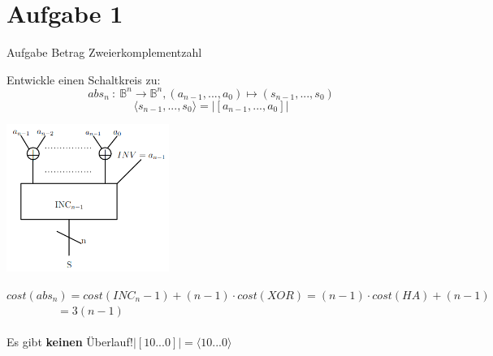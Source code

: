 
\section{Aufgabe 1}

\setcounter{exercise}{1}

\begin{frame}[allowframebreaks]{Aufgabe \thesection}{Betrag Zweierkomplementzahl}

\begin{exercisenoinc}
Entwickle einen Schaltkreis zu:\\
$$abs_n\ :\ \mathbb{B}^n\rightarrow\mathbb{B}^n, (a_{n-1},...,a_0)\mapsto (s_{n-1},...,s_0)$$
$$\langle s_{n-1},...,s_0\rangle = |[a_{n-1},...,a_0]|$$
\end{exercisenoinc}


\begin{solutionnoinc}
    \center \includegraphics[width=150pt]{figures/Absolute.png}
\end{solutionnoinc}

\begin{solutionnoinc}
    $cost(abs_n)=cost(INC_n-1)+(n-1)\cdot cost(XOR)=(n-1)\cdot cost(HA)+(n-1)$\\ $\qquad\qquad\ \ =3(n-1)$\\\ \\
    Es gibt \textbf{keinen} Überlauf!\quad $|[10...0]|= \langle 10...0\rangle$
\end{solutionnoinc}

\end{frame}
